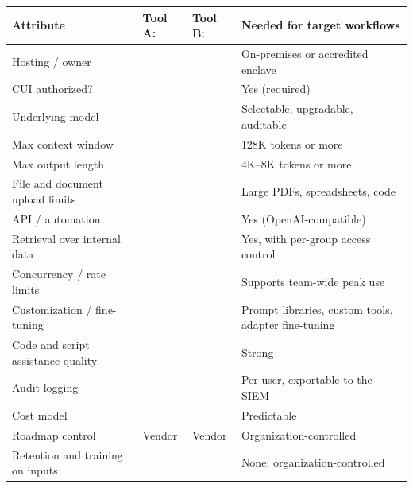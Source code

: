 

{\footnotesize
\begin{xltabular}{\textwidth}{@{}Y{1.053}Y{0.842}Y{0.842}Y{1.263}@{}}
  \toprule
  Attribute & Tool A:  & Tool B:  & Needed for target workflows \\
  \midrule
  \endhead
  Hosting / owner & \PH{ } & \PH{ } & On-premises or accredited enclave \\
  CUI authorized? & \PH{ } & \PH{ } & Yes (required) \\
  Underlying model & \PH{ } & \PH{ } & Selectable, upgradable, auditable \\
  Max context window &  & \PH{ } & 128K tokens or more \\
  Max output length & \PH{ } & \PH{ } & 4K--8K tokens or more \\
  File and document upload limits & \PH{ } & \PH{ } & Large PDFs, spreadsheets, code \\
  API / automation & \PH{ } & \PH{ } & Yes (OpenAI-compatible) \\
  Retrieval over internal data & \PH{ } & \PH{ } & Yes, with per-group access control \\
  Concurrency / rate limits & \PH{ } & \PH{ } & Supports team-wide peak use \\
  Customization / fine-tuning & \PH{ } & \PH{ } & Prompt libraries, custom tools, adapter fine-tuning \\
  Code and script assistance quality & \PH{ } & \PH{ } & Strong \\
  Audit logging & \PH{ } & \PH{ } & Per-user, exportable to the SIEM \\
  Cost model & \PH{ } & \PH{ } & Predictable \\
  Roadmap control & Vendor & Vendor & Organization-controlled \\
  Retention and training on inputs & \PH{ } & \PH{ } & None; organization-controlled \\
  \bottomrule
\end{xltabular}}

